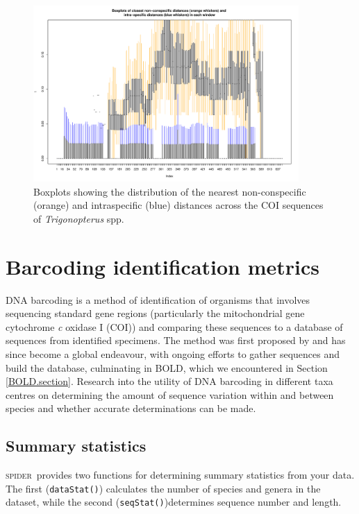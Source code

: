 \documentclass{article}
\newcommand{\spider}{\textsc{spider}~} %
\newcommand{\fun}[1]{\texttt{#1}}
\begin{document}
\begin{figure}[p]
	\centering
	\includegraphics[width=0.9\textwidth]{weevilsBox}
	\caption{Boxplots showing the distribution of the nearest non-conspecific (orange) and intraspecific (blue) distances across the COI sequences of \emph{Trigonopterus} spp.}
	\label{weevilsBox.fig}
\end{figure}



\section{Barcoding identification metrics}
DNA barcoding is a method of identification of organisms that involves sequencing  standard gene regions (particularly the mitochondrial gene cytochrome \emph{c} oxidase I (COI)) and comparing these sequences to a database of sequences from identified specimens. The method was first proposed by \citet{Her.etal.2003.barcoding} and has since become a global endeavour, with ongoing efforts to gather sequences and build the database, culminating in BOLD, which we encountered in Section \ref{BOLD.section}. Research into the utility of DNA barcoding in different taxa centres on determining the amount of sequence variation within and between species and whether accurate determinations can be made. 

\subsection{Summary statistics}
\spider provides two functions for determining summary statistics from your data. The first (\fun{dataStat()}) calculates the number of species and genera in the dataset, while the second (\fun{seqStat()})determines sequence number and length.
\end{document}
